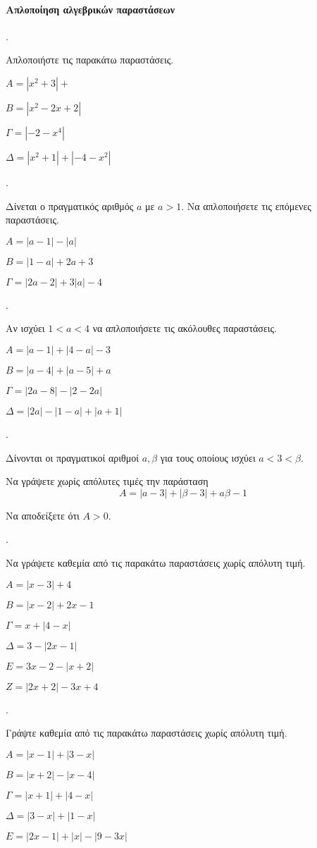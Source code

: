\documentclass[11pt,a4paper,twocolumn]{article}
\newcounter{askhsh}
\newcommand{\askhsh}{{\large\theaskhsh.}\ \addtocounter{askhsh}{1}}
\begin{document}
\paragraph{Απλοποίηση αλγεβρικών παραστάσεων}
\askhsh Απλοποιήστε τις παρακάτω παραστάσεις.
\begin{alist}
\item $A=\left|x^2+3\right|+$
\item $B=\left|x^2-2x+2\right|$
\item $\varGamma=\left|-2-x^4\right|$
\item $\varDelta=\left|x^2+1\right|+\left|-4-x^2\right|$
\end{alist}
\askhsh Δίνεται ο πραγματικός αριθμός $a$ με $a>1$. Να απλοποιήσετε τις επόμενες παραστάσεις.
\begin{alist}
\item $A=|a-1|-|a|$
\item $B=|1-a|+2a+3$
\item $\varGamma=|2a-2|+3|a|-4$
\end{alist}
\askhsh Αν ισχύει $1<a<4$ να απλοποιήσετε τις ακόλουθες παραστάσεις.
\begin{alist}
\item $A=|a-1|+|4-a|-3$
\item $B=|a-4|+|a-5|+a$
\item $\varGamma=|2a-8|-|2-2a|$
\item $\varDelta=|2a|-|1-a|+|a+1|$
\end{alist}
\askhsh Δίνονται οι πραγματικοί αριθμοί $a,\beta$ για τους οποίους ισχύει $a<3<\beta$.
\begin{alist}
\item Να γράψετε χωρίς απόλυτες τιμές την παράσταση
\[ A=|a-3|+|\beta-3|+a\beta-1 \]
\item Να αποδείξετε ότι $A>0$.
\end{alist}
\askhsh Να γράψετε καθεμία από τις παρακάτω παραστάσεις χωρίς απόλυτη τιμή.
\begin{alist}
\item $A=|x-3|+4$
\item $B=|x-2|+2x-1$
\item $\varGamma=x+|4-x|$
\item $\varDelta=3-|2x-1|$
\item $E=3x-2-|x+2|$
\item $Z=|2x+2|-3x+4$
\end{alist}
\askhsh Γράψτε καθεμία από τις παρακάτω παραστάσεις χωρίς απόλυτη τιμή.
\begin{alist}
\item $Α=|x-1|+|3-x|$
\item $B=|x+2|-|x-4|$
\item $\varGamma=|x+1|+|4-x|$
\item $\varDelta=|3-x|+|1-x|$
\item $E=|2x-1|+|x|-|9-3x|$
\end{alist}
\end{document}

